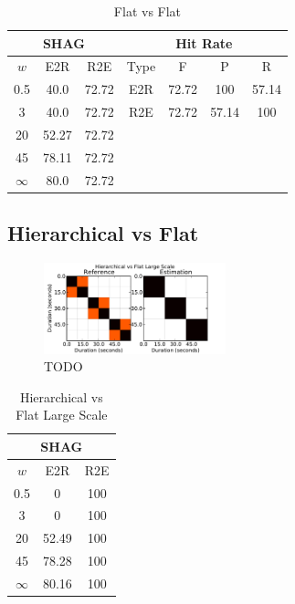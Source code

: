 \documentclass{article}
\begin{document}
\begin{table}
 \begin{center}
   \begin{tabular}{|c|c|c||c|c|c|c|}
  \hline
  \multicolumn{3}{|c||}{\textbf{SHAG}} & \multicolumn{4}{c|}{\textbf{Hit Rate}} \\
  \hline
  $w$ & E2R    & R2E & Type & F     & P     & R \\
  \hline
  0.5       & 40.0   & 72.72   & E2R & 72.72  & 100 & 57.14 \\
  3         & 40.0   & 72.72   & R2E & 72.72  & 57.14 & 100  \\
  \cline{4-7}
  20        & 52.27  & 72.72   \\
  45        & 78.11  & 72.72   \\
  $\infty$  & 80.0   & 72.72   \\
  \cline{1-3}
 \end{tabular}
\end{center}
  \caption{Flat vs Flat}
  \label{tab:flat-flatoldmerda}
\end{table}

\subsection{Hierarchical vs Flat}

\begin{figure}
  \centering
  \includegraphics[width=0.47\textwidth]{plots/hier-flatlarge.pdf}
  \caption{TODO}
  \label{fig:hier-flatlarge}
\end{figure}%

\begin{table}
 \begin{center}
   \begin{tabular}{|c|c|c|}
  \hline
  \multicolumn{3}{|c|}{\textbf{SHAG}} \\
  \hline
  $w$       & E2R    & R2E      \\
  \hline
  0.5       & 0         & 100      \\     
  3         & 0         & 100      \\
  20        & 52.49     & 100    \\
  45        & 78.28     & 100    \\
  $\infty$  & 80.16     & 100    \\
  \hline
 \end{tabular}
\end{center}
  \caption{Hierarchical vs Flat Large Scale}
  \label{tab:hier-flatlarge}
\end{table}
\end{document}
